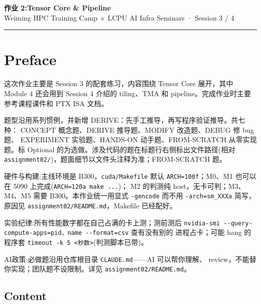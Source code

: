 \documentclass[11pt,a4paper,fontset=fandol]{ctexart}
\begin{document}
\begin{center}
  {\LARGE\bfseries 作业 2:Tensor Core \& Pipeline}\\[6pt]
  {\sffamily Weiming HPC Training Camp \(\times\) LCPU AI Infra Seminars
· Session 3 / 4}
\end{center}

\vspace{0.5em}
\hrule
\vspace{1em}

\setcounter{section}{-1}

\section*{Preface}\label{preface}

这次作业主要是 Session 3 的配套练习，内容围绕 Tensor Core 展开，其中
Module 4 还会用到 Session 4 介绍的 tiling、TMA 和
pipeline。完成作业时主要参考课程课件和 PTX ISA 文档。

题型沿用系列惯例，并新增 DERIVE：先手工推导，再写程序验证推导。共七种：
CONCEPT 概念题、DERIVE 推导题、MODIFY 改造题、DEBUG 修 bug 题、
EXPERIMENT 实验题、HANDS-ON 动手题、FROM-SCRATCH 从零实现题。标 Optional
的为选做。涉及代码的题在标题行右侧标出文件路径(相对
\texttt{assignment02/})，题面细节以文件头注释为准；FROM-SCRATCH 题。

硬件与构建:主线环境是 B300，\texttt{cuda/Makefile} 默认
\texttt{ARCH=100f}；M0、M1 也可以在 5090
上完成(\texttt{ARCH=120a\ make\ ...})； M2 的判测纯
host，无卡可判；M3、M4、M5 需要 B300。本作业统一用显式 \texttt{-gencode}
而不用 \texttt{-arch=sm\_XXXa} 简写，原因见
\texttt{assignment02/README.md}，Makefile 已经配好。

实验纪律:所有性能数字都在自己占满的卡上测；测前测后
\texttt{nvidia-smi\ -\/-query-compute-apps=pid，name\ -\/-format=csv}
查有没有别的 进程占卡；可能 hang 的程序套
\texttt{timeout\ -k\ 5\ \textless{}秒数\textgreater{}}(判测脚本已带)。

AI政策:必做题沿用仓库根目录 \texttt{CLAUDE.md}------AI 可以帮你理解、
review，不能替你实现；团队题不设限制。详见
\texttt{assignment02/README.md}。

\subsection*{Content}\label{content}
\end{document}
